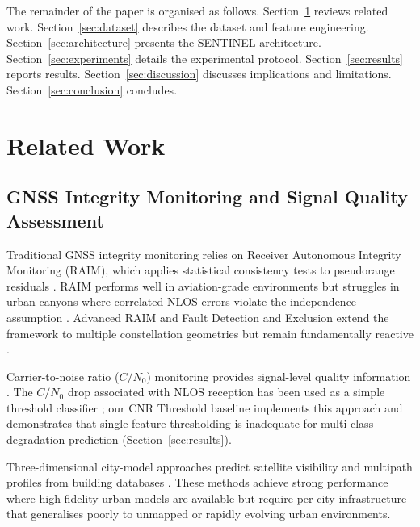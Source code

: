 \documentclass[pdflatex,sn-mathphys-num]{sn-jnl}
\begin{document}
The remainder of the paper is organised as follows.
Section~\ref{sec:related} reviews related work.
Section~\ref{sec:dataset} describes the dataset and feature engineering.
Section~\ref{sec:architecture} presents the SENTINEL architecture.
Section~\ref{sec:experiments} details the experimental protocol.
Section~\ref{sec:results} reports results.
Section~\ref{sec:discussion} discusses implications and limitations.
Section~\ref{sec:conclusion} concludes.

\section{Related Work}\label{sec:related}

\subsection{GNSS Integrity Monitoring and Signal Quality Assessment}

Traditional GNSS integrity monitoring relies on Receiver Autonomous Integrity
Monitoring (RAIM), which applies statistical consistency tests to pseudorange
residuals \cite{[AuthorYear_RAIM_classic]}.  RAIM performs well in
aviation-grade environments but struggles in urban canyons where correlated
NLOS errors violate the independence assumption
\cite{[AuthorYear_RAIM_urban_limit]}.  Advanced RAIM and Fault Detection and
Exclusion extend the framework to multiple constellation geometries but remain
fundamentally reactive \cite{[AuthorYear_ARAIM]}.

Carrier-to-noise ratio ($C/N_0$) monitoring provides signal-level quality
information \cite{[AuthorYear_CNR_monitoring]}.  The $C/N_0$ drop associated
with NLOS reception has been used as a simple threshold classifier
\cite{[AuthorYear_CNR_threshold_NLOS]}; our CNR Threshold baseline implements
this approach and demonstrates that single-feature thresholding is inadequate
for multi-class degradation prediction (Section~\ref{sec:results}).

Three-dimensional city-model approaches predict satellite visibility and
multipath profiles from building databases
\cite{[AuthorYear_3D_city_model], [AuthorYear_shadow_matching]}.  These
methods achieve strong performance where high-fidelity urban models are
available but require per-city infrastructure that generalises poorly to
unmapped or rapidly evolving urban environments.
\end{document}
